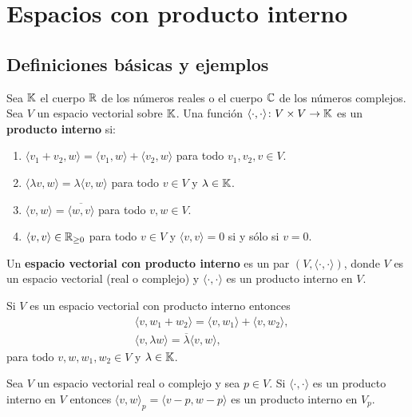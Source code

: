 \chapter{Espacios con producto interno}

\section{Definiciones básicas y ejemplos}

\begin{block}
	Sea $\mathbb{K}$ el cuerpo $\mathbb{R}$ de los números reales o el cuerpo $\mathbb{C}$ de los
	números complejos. Sea $V$ un espacio vectorial sobre $\mathbb{K}$.  Una función
	$\langle\cdot,\cdot\rangle\colon V\times V\to\mathbb{K}$ es un \textbf{producto
	interno} si:
	\begin{enumerate}
		\item $\langle v_1+v_2,w\rangle=\langle v_1,w\rangle+\langle v_2,w\rangle$ para todo $v_1,v_2,v\in V$.
		\item $\langle \lambda v,w\rangle=\lambda\langle v,w\rangle$ para todo $v\in V$ y $\lambda\in\mathbb{K}$.
		\item $\langle v,w\rangle=\overline{\langle w,v\rangle}$ para todo $v,w\in V$.
		\item $\langle v,v\rangle\in\mathbb{R}_{\geq0}$ para todo $v\in V$ y $\langle v,v\rangle=0$ si y sólo si $v=0$. 
	\end{enumerate}
	Un \textbf{espacio vectorial con producto interno} es un par
	$(V,\langle\cdot,\cdot\rangle)$, donde $V$ es un espacio vectorial (real o
	complejo) y $\langle\cdot,\cdot\rangle$ es un producto interno en $V$. 
\end{block}

\begin{block}
    Si $V$ es un espacio vectorial con producto interno entonces 
    \begin{align*}
        &\langle v,w_1+w_2\rangle=\langle v,w_1\rangle+\langle v,w_2\rangle,\\
        &\langle v,\lambda w\rangle=\overline{\lambda}\langle v,w\rangle, 
    \end{align*}
    para todo $v,w,w_1,w_2\in V$ y $\lambda\in\mathbb{K}$. 
\end{block}

\begin{xca}
	Sea $V$ un espacio vectorial real o complejo y sea $p\in V$.  Si
	$\langle\cdot,\cdot\rangle$ es un producto interno en $V$ entonces $\langle
	v,w\rangle_p=\langle v-p,w-p\rangle$ es un producto interno en $V_p$. 
\end{xca}

